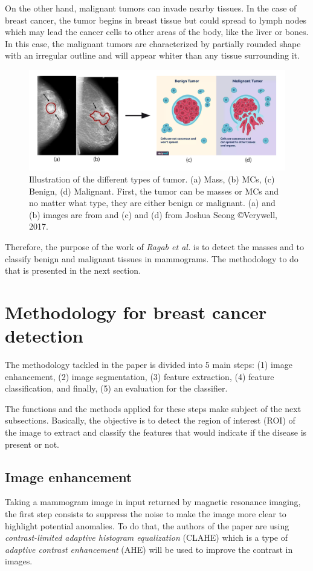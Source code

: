 \documentclass[11pt, openany]{report}
\theoremstyle{plain}
\theoremstyle{definition}
\theoremstyle{remark}
\begin{document}
On the other hand, malignant tumors can invade nearby tissues. In the case of breast cancer, the tumor begins in breast tissue but could spread to lymph nodes which may lead the cancer cells to other areas of the body, like the liver or bones. In this case, the malignant tumors are characterized by partially rounded shape with an irregular outline and will appear whiter than any tissue surrounding it.

\begin{figure}[h]
  \centering
  \includegraphics[scale=0.28]{figures/tumor-types.png}
  \caption{Illustration of the different types of tumor. (a) Mass, (b) MCs, (c) Benign, (d) Malignant. First, the tumor can be masses or MCs and no matter what type, they are either benign or malignant. (a) and (b) images are from \cite{breast-cancer} and (c) and (d) from Joshua Seong \copyright Verywell, 2017.}
  \label{fig:tumor-types}
\end{figure}

Therefore, the purpose of the work of \textit{Ragab et al.} \cite{breast-cancer} is to detect the masses and to classify benign and malignant tissues in mammograms. The methodology to do that is presented in the next section.  

\section{Methodology for breast cancer detection}
The methodology tackled in the paper \cite{breast-cancer} is divided into 5 main steps: (1) image enhancement, (2) image segmentation, (3) feature extraction, (4) feature classification, and finally, (5) an evaluation for the classifier. 

The functions and the methods applied for these steps make subject of the next subsections. Basically, the objective is to detect the region of interest (ROI) of the image to extract and classify the features that would indicate if the disease is present or not. 

\subsection{Image enhancement} \label{sec:img-enhancement-breast}
Taking a mammogram image in input returned by magnetic resonance imaging, the first step consists to suppress the noise to make the image more clear to highlight potential anomalies. To do that, the authors of the paper are using \textit{contrast-limited adaptive histogram equalization} (CLAHE) which is a type of \textit{adaptive contrast enhancement} (AHE) will be used to improve the contrast in images.  
\end{document}
